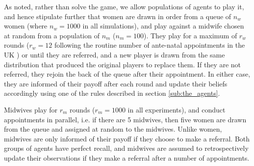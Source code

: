 As noted, rather than solve the game, we allow populations of agents to play it, and hence stipulate further that women are drawn in order from a queue of \(n_{w}\) women (where \(n_{w}=1000\) in all simulations), and play against a midwife chosen at random from a population of \(n_{m}\) (\(n_{m}=100\)). They play for a maximum of \(r_{w}\) rounds (\(r_{w}=12\) following the routine number of ante-natal appointments in the UK \citep{NICE2010a}) or until they are referred, and a new player is drawn from the same distribution that produced the original players to replace them. If they are not referred, they rejoin the back of the queue after their appointment. In either case, they are informed of their payoff after each round and update their beliefs accordingly using one of the rules described in section \ref{sub:the_agents}.

Midwives play for \(r_{m}\) rounds (\(r_{m}=1000\) in all experiments), and conduct appointments in parallel, i.e. if there are 5 midwives, then five women are drawn from the queue and assigned at random to the midwives. 
Unlike women, midwives are only informed of their payoff if they choose to make a referral. Both groups of agents have perfect recall, and midwives are assumed to retrospectively update their observations if they make a referral after a number of appointments.